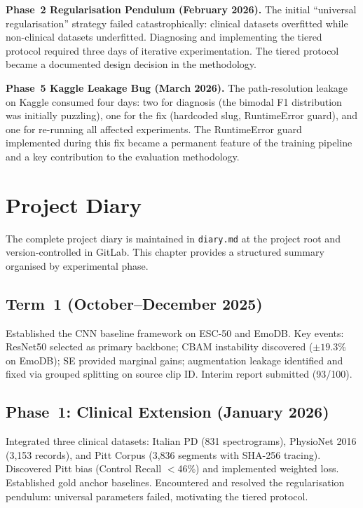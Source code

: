 \documentclass[oneside,openany]{final_report}
\begin{document}
\textbf{Phase~2 Regularisation Pendulum (February 2026).} The initial ``universal regularisation'' strategy failed catastrophically: clinical datasets overfitted while non-clinical datasets underfitted. Diagnosing and implementing the tiered protocol required three days of iterative experimentation. The tiered protocol became a documented design decision in the methodology.

\textbf{Phase~5 Kaggle Leakage Bug (March 2026).} The path-resolution leakage on Kaggle consumed four days: two for diagnosis (the bimodal F1 distribution was initially puzzling), one for the fix (hardcoded slug, RuntimeError guard), and one for re-running all affected experiments. The RuntimeError guard implemented during this fix became a permanent feature of the training pipeline and a key contribution to the evaluation methodology.

\chapter{Project Diary}

The complete project diary is maintained in \texttt{diary.md} at the project root and version-controlled in GitLab. This chapter provides a structured summary organised by experimental phase.

\section{Term~1 (October--December 2025)}
Established the CNN baseline framework on ESC-50 and EmoDB. Key events: ResNet50 selected as primary backbone; CBAM instability discovered ($\pm 19.3\%$ on EmoDB); SE provided marginal gains; augmentation leakage identified and fixed via grouped splitting on source clip ID. Interim report submitted (93/100).

\section{Phase~1: Clinical Extension (January 2026)}
Integrated three clinical datasets: Italian PD (831 spectrograms), PhysioNet 2016 (3,153 records), and Pitt Corpus (3,836 segments with SHA-256 tracing). Discovered Pitt bias (Control Recall $<$46\%) and implemented weighted loss. Established gold anchor baselines. Encountered and resolved the regularisation pendulum: universal parameters failed, motivating the tiered protocol.
\end{document}
